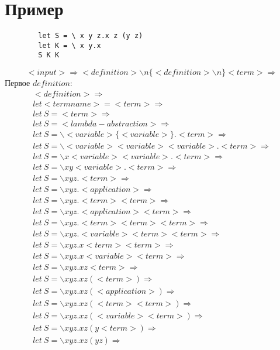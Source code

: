 \documentclass[12pt]{article}
\begin{document}
\section{Пример}
    \begin{verbatim}
        let S = \ x y z.x z (y z)
        let K = \ x y.x
        S K K
    \end{verbatim}
    $$<input> \Rightarrow <definition> \backslash n \{<definition> \backslash n\} <term> \Rightarrow$$
    Первое $definition$:
            \begin{eqnarray}
            <definition>\Rightarrow \\
            let <termname> = <term> \Rightarrow \\
            let\ S = <term> \Rightarrow \\
            let \  S = <lambda-abstraction> \Rightarrow \\
            let \  S = \backslash<variable>\{<variable>\}.<term> \Rightarrow \\
            let \  S = \backslash<variable><variable><variable>.<term> \Rightarrow \\
            let \  S = \backslash x <variable><variable>.<term> \Rightarrow \\
            let \  S = \backslash x y <variable>.<term> \Rightarrow \\
            let \  S = \backslash x y z.<term> \Rightarrow \\
            let \  S = \backslash x y z.<application> \Rightarrow \\
            let \  S = \backslash x y z.<term> <term> \Rightarrow \\
            let \  S = \backslash x y z.<application> <term> \Rightarrow \\
            let \  S = \backslash x y z.<term> <term> <term> \Rightarrow \\
            let \  S = \backslash x y z.<variable> <term> <term> \Rightarrow \\
            let \  S = \backslash x y z.x <term> <term> \Rightarrow \\
            let \  S = \backslash x y z.x <variable> <term> \Rightarrow \\
            let \  S = \backslash x y z.x z <term> \Rightarrow \\
            let \  S = \backslash x y z.x z (<term>) \Rightarrow \\
            let \  S = \backslash x y z.x z (<application>) \Rightarrow \\
            let \  S = \backslash x y z.x z (<term> <term>) \Rightarrow \\
            let \  S = \backslash x y z.x z (<variable> <term>) \Rightarrow \\
            let \  S = \backslash x y z.x z (y <term>) \Rightarrow \\
            let \  S = \backslash x y z.x z (y z) \Rightarrow
        \end{eqnarray}
\end{document}
